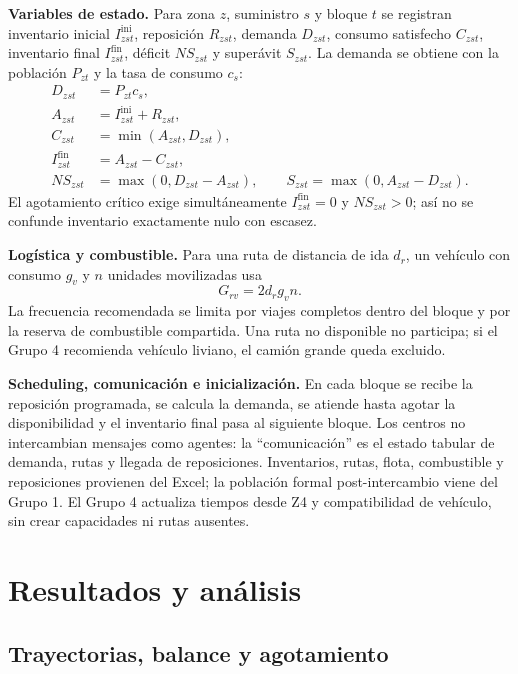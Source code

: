 \documentclass[11pt,letterpaper]{article}
\begin{document}
\textbf{Variables de estado.} Para zona $z$, suministro $s$ y bloque $t$ se
registran inventario inicial $I^{\mathrm{ini}}_{zst}$, reposición $R_{zst}$,
demanda $D_{zst}$, consumo satisfecho $C_{zst}$, inventario final
$I^{\mathrm{fin}}_{zst}$, déficit $NS_{zst}$ y superávit $S_{zst}$. La demanda
se obtiene con la población $P_{zt}$ y la tasa de consumo $c_s$:
\begin{align}
D_{zst}&=P_{zt}c_s,\\
A_{zst}&=I^{\mathrm{ini}}_{zst}+R_{zst},\\
C_{zst}&=\min(A_{zst},D_{zst}),\\
I^{\mathrm{fin}}_{zst}&=A_{zst}-C_{zst},\\
NS_{zst}&=\max(0,D_{zst}-A_{zst}),\qquad
S_{zst}=\max(0,A_{zst}-D_{zst}).
\end{align}
El agotamiento crítico exige simultáneamente $I^{\mathrm{fin}}_{zst}=0$ y
$NS_{zst}>0$; así no se confunde inventario exactamente nulo con escasez.

\textbf{Logística y combustible.} Para una ruta de distancia de ida $d_r$, un
vehículo con consumo $g_v$ y $n$ unidades movilizadas usa
\begin{equation}
G_{rv}=2d_r g_v n.
\end{equation}
La frecuencia recomendada se limita por viajes completos dentro del bloque y
por la reserva de combustible compartida. Una ruta no disponible no participa;
si el Grupo 4 recomienda vehículo liviano, el camión grande queda excluido.

\textbf{Scheduling, comunicación e inicialización.} En cada bloque se recibe la
reposición programada, se calcula la demanda, se atiende hasta agotar la
disponibilidad y el inventario final pasa al siguiente bloque. Los centros no
intercambian mensajes como agentes: la ``comunicación'' es el estado tabular de
demanda, rutas y llegada de reposiciones. Inventarios, rutas, flota, combustible
y reposiciones provienen del Excel; la población formal post-intercambio viene
del Grupo 1. El Grupo 4 actualiza tiempos desde Z4 y compatibilidad de vehículo,
sin crear capacidades ni rutas ausentes.

\section{Resultados y análisis}

\subsection{Trayectorias, balance y agotamiento}
\end{document}
